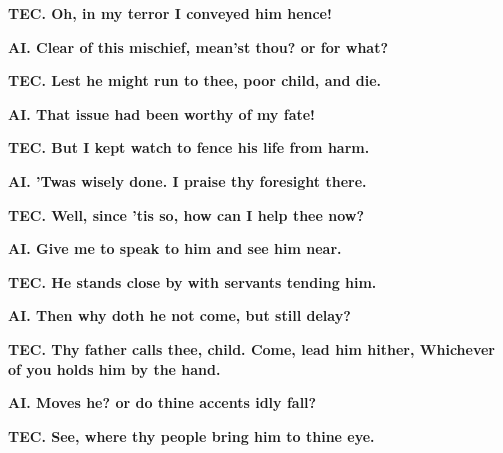 \documentclass[11pt,letter]{book}
\begin{document}
\par \textbf{TEC. Oh, in my terror I conveyed him hence!}
\par 

\par \textbf{AI. Clear of this mischief, mean’st thou? or for what?}
\par 

\par \textbf{TEC. Lest he might run to thee, poor child, and die.}
\par 

\par \textbf{AI. That issue had been worthy of my fate!}
\par 

\par \textbf{TEC. But I kept watch to fence his life from harm.}
\par 

\par \textbf{AI. ’Twas wisely done. I praise thy foresight there.}
\par 

\par \textbf{TEC. Well, since ’tis so, how can I help thee now?}
\par 

\par \textbf{AI. Give me to speak to him and see him near.}
\par 

\par \textbf{TEC. He stands close by with servants tending him.}
\par 

\par \textbf{AI. Then why doth he not come, but still delay?}
\par 

\par \textbf{TEC. Thy father calls thee, child. Come, lead him hither, Whichever of you holds him by the hand.}
\par 

\par \textbf{AI. Moves he? or do thine accents idly fall?}
\par 

\par \textbf{TEC. See, where thy people bring him to thine eye.}
\par 
\end{document}
